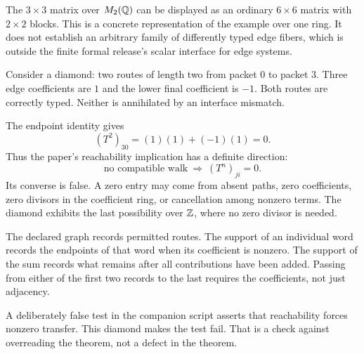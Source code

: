 The $3\times3$ matrix over $M_2(\mathbb Q)$ can be displayed as an ordinary $6\times6$ matrix with $2\times2$ blocks. This is a concrete representation of the example over one ring. It does not establish an arbitrary family of differently typed edge fibers, which is outside the finite formal release's scalar interface for edge systems.


Consider a diamond: two routes of length two from packet $0$ to packet $3$. Three edge coefficients are $1$ and the lower final coefficient is $-1$. Both routes are correctly typed. Neither is annihilated by an interface mismatch.


The endpoint identity gives
\[
(T^2)_{30}=(1)(1)+(-1)(1)=0.
\]
Thus the paper's reachability implication has a definite direction:
\[
\text{no compatible walk}\ \Longrightarrow\ (T^n)_{ji}=0.
\]
Its converse is false. A zero entry may come from absent paths, zero coefficients, zero divisors in the coefficient ring, or cancellation among nonzero terms. The diamond exhibits the last possibility over $\mathbb Z$, where no zero divisor is needed.

The declared graph records permitted routes. The support of an individual word records the endpoints of that word when its coefficient is nonzero. The support of the sum records what remains after all contributions have been added. Passing from either of the first two records to the last requires the coefficients, not just adjacency.

A deliberately false test in the companion script asserts that reachability forces nonzero transfer. This diamond makes the test fail. That is a check against overreading the theorem, not a defect in the theorem.


